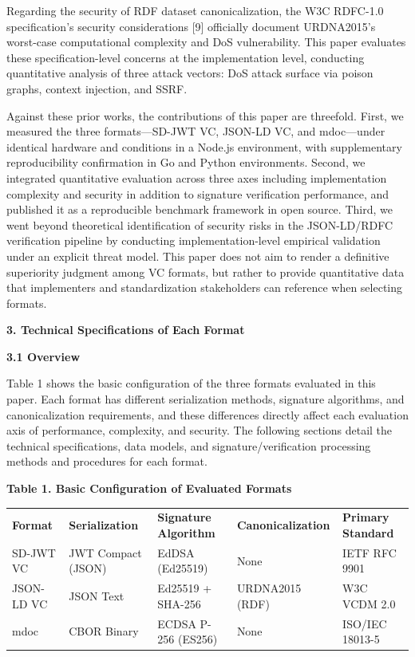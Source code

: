 Regarding the security of RDF dataset canonicalization, the W3C RDFC-1.0 specification's security considerations {[}9{]} officially document URDNA2015's worst-case computational complexity and DoS vulnerability. This paper evaluates these specification-level concerns at the implementation level, conducting quantitative analysis of three attack vectors: DoS attack surface via poison graphs, context injection, and SSRF.

Against these prior works, the contributions of this paper are threefold. First, we measured the three formats---SD-JWT VC, JSON-LD VC, and mdoc---under identical hardware and conditions in a Node.js environment, with supplementary reproducibility confirmation in Go and Python environments. Second, we integrated quantitative evaluation across three axes including implementation complexity and security in addition to signature verification performance, and published it as a reproducible benchmark framework in open source. Third, we went beyond theoretical identification of security risks in the JSON-LD/RDFC verification pipeline by conducting implementation-level empirical validation under an explicit threat model. This paper does not aim to render a definitive superiority judgment among VC formats, but rather to provide quantitative data that implementers and standardization stakeholders can reference when selecting formats.

\textbf{3. Technical Specifications of Each Format}

\textbf{3.1 Overview}

Table 1 shows the basic configuration of the three formats evaluated in this paper. Each format has different serialization methods, signature algorithms, and canonicalization requirements, and these differences directly affect each evaluation axis of performance, complexity, and security. The following sections detail the technical specifications, data models, and signature/verification processing methods and procedures for each format.

\textbf{Table 1. Basic Configuration of Evaluated Formats}

\begin{longtable}[]{@{}lllll@{}}
\toprule
\endhead
\textbf{Format} & \textbf{Serialization} & \textbf{Signature Algorithm} & \textbf{Canonicalization} & \textbf{Primary Standard}\tabularnewline
SD-JWT VC & JWT Compact (JSON) & EdDSA (Ed25519) & None & IETF RFC 9901\tabularnewline
JSON-LD VC & JSON Text & Ed25519 + SHA-256 & URDNA2015 (RDF) & W3C VCDM 2.0\tabularnewline
mdoc & CBOR Binary & ECDSA P-256 (ES256) & None & ISO/IEC 18013-5\tabularnewline
\bottomrule
\end{longtable}

